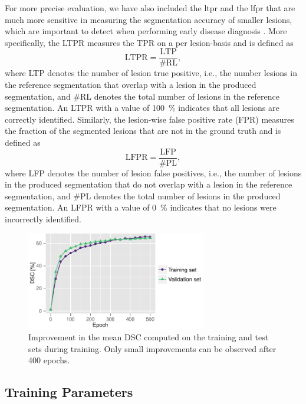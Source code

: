 For more precise evaluation, we have also included the \gls{ltpr} and the
\gls{lfpr} that are much more sensitive in measuring the segmentation accuracy
of smaller lesions, which are important to detect when performing early disease
diagnosis \citep{garcia2013review}. More specifically, the LTPR measures the TPR
on a per lesion-basis and is defined as
\begin{equation}
\text{LTPR} = \frac{\text{LTP}}{\text{\#RL}},
\end{equation}
where LTP denotes the number of lesion true positive, i.e., the number
lesions in the reference segmentation that overlap with a lesion in the produced
segmentation, and \#RL denotes the total number of lesions in the reference
segmentation. An LTPR with a value of \SI{100}{\percent} indicates that all
lesions are correctly identified. Similarly, the lesion-wise false positive rate
(FPR) measures the fraction of the segmented lesions that are not in the ground
truth and is defined as
\begin{equation}
\text{LFPR} = \frac{\text{LFP}}{\text{\#PL}},
\end{equation}
where LFP denotes the number of lesion false positives, i.e., the number of
lesions in the produced segmentation that do not overlap with a lesion in the
reference segmentation, and \#PL denotes the total number of lesions in the
produced segmentation. An LFPR with a value of \SI{0}{\percent} indicates that
no lesions were incorrectly identified.

\begin{figure}[tb]
\centering
\includegraphics[width=0.7\textwidth]{figures/tmi/ems_progress}
\caption[Improvement in the mean DSC computed on the training and test sets
during training]{Improvement in the mean DSC computed on the training and test
sets during training. Only small improvements can be observed after 400 epochs.}
\label{fig:epochs}
\end{figure}

\subsection[Training parameters]{Training Parameters}
\label{sec:trainparams}


